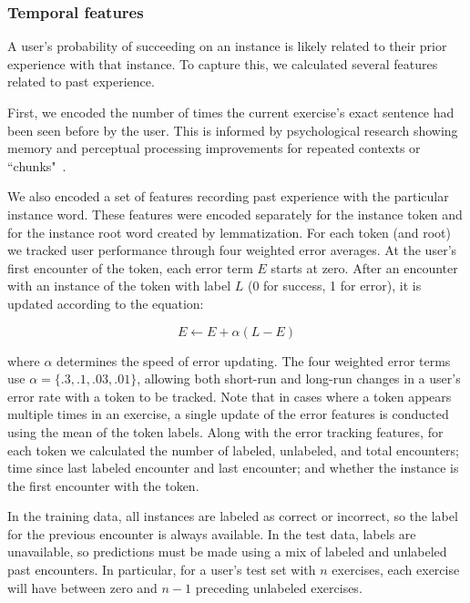 \documentclass[11pt,a4paper]{article}
\begin{document}
\subsubsection{Temporal features}

A user's probability of succeeding on an instance is likely related to their
prior experience with that instance. To capture this, we calculated several
features related to past experience. 

First, we encoded the number of times the
current exercise's exact sentence had been seen before by the user. This is
informed by psychological research showing memory and perceptual processing
improvements for repeated contexts or ``chunks"~\cite[e.g.,][]{Chun:1999gt}. 

We also encoded a set of features recording past experience with
the particular instance word. These features were encoded separately for the
instance token and for the instance root word created by lemmatization.
For each token (and root) we tracked user performance through four weighted
error averages. At the user's first encounter of the token, each error term $E$ starts at
zero. After an encounter with an instance of the token with label $L$ (0 for
success, 1 for error), it is
updated according to the equation:

\[
E \leftarrow E + \alpha (L - E)
\]

where $\alpha$ determines the speed of error updating. The four weighted
error terms use $\alpha = \{.3, .1, .03, .01\}$, allowing both short-run and
long-run changes in a user's error rate with a token to be tracked. Note that in
cases where a token appears multiple times in an exercise, a single update of
the error features is conducted using the mean of the token labels.
Along with the error tracking features, for each token we calculated the number
of labeled, unlabeled, and total encounters; time since last labeled encounter and
last encounter; and whether the instance is the first encounter with the
token.

In the training data, all instances are labeled as correct or incorrect, so the
label for the previous encounter is always available. In the test data, labels
are unavailable, so predictions must be made using a mix of labeled and
unlabeled past encounters. In particular, for a user's test set with $n$
exercises, each exercise will have between zero and $n-1$ preceding unlabeled exercises.
\end{document}
